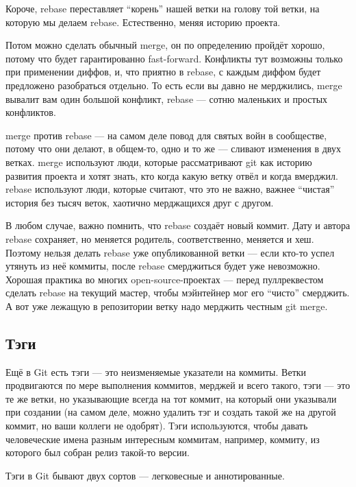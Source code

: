 \documentclass[a5paper]{article}
\begin{document}
Короче, rebase переставляет ``корень'' нашей ветки на голову той ветки, на которую мы делаем rebase. Естественно, меняя историю проекта.

Потом можно сделать обычный merge, он по определению пройдёт хорошо, потому что будет гарантированно fast-forward. Конфликты тут возможны только при применении диффов, и, что приятно в rebase, с каждым диффом будет предложено разобраться отдельно. То есть если вы давно не мерджились, merge вывалит вам один большой конфликт, rebase --- сотню маленьких и простых конфликтов.

merge против rebase --- на самом деле повод для святых войн в сообществе, потому что они делают, в общем-то, одно и то же --- сливают изменения в двух ветках. merge используют люди, которые рассматривают git как историю развития проекта и хотят знать, кто когда какую ветку отвёл и когда вмерджил. rebase используют люди, которые считают, что это не важно, важнее ``чистая'' история без тысяч веток, хаотично мерджащихся друг с другом.

В любом случае, важно помнить, что rebase создаёт новый коммит. Дату и автора rebase сохраняет, но меняется родитель, соответственно, меняется и хеш. Поэтому нельзя делать rebase уже опубликованной ветки --- если кто-то успел утянуть из неё коммиты, после rebase смерджиться будет уже невозможно. Хорошая практика во многих open-source-проектах --- перед пуллреквестом сделать rebase на текущий мастер, чтобы мэйнтейнер мог его ``чисто'' смерджить. А вот уже лежащую в репозитории ветку надо мерджить честным git merge.

\subsection{Тэги}

Ещё в Git есть тэги --- это неизменяемые указатели на коммиты. Ветки продвигаются по мере выполнения коммитов, мерджей и всего такого, тэги --- это те же ветки, но указывающие всегда на тот коммит, на который они указывали при создании (на самом деле, можно удалить тэг и создать такой же на другой коммит, но ваши коллеги не одобрят). Тэги используются, чтобы давать человеческие имена разным интересным коммитам, например, коммиту, из которого был собран релиз такой-то версии.

Тэги в Git бывают двух сортов --- легковесные и аннотированные. 
\end{document}
